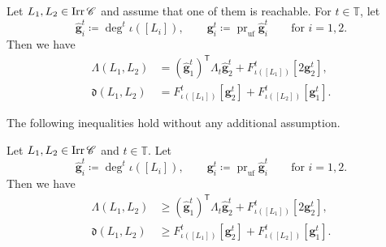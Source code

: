 \begin{Thm}
\label{Thm : tropical F invariants and reachable modules}
Let $L_1, L_2 \in \mathop{\mathrm{Irr}}\nolimits\mathscr{C}$ and assume that one of them
is reachable.
For $t \in \mathbb{T}$, let
\[
\widehat{\mathbf{g}}_i^t \coloneq \deg^t\iota([L_i]),
\qquad
\mathbf{g}_i^t \coloneq
\operatorname{pr}_{\mathrm{uf}}\widehat{\mathbf{g}}_i^t
\qquad\text{for }i = 1, 2.
\]
Then we have
\[
\begin{aligned}
\Lambda(L_1, L_2)
&= (\widehat{\mathbf{g}}_1^t)^{\mathsf{T}}
\Lambda_t\widehat{\mathbf{g}}_2^t
+ F_{\iota([L_1])}^t[2\mathbf{g}_2^t], \\
\mathfrak{d}(L_1, L_2)
&= F_{\iota([L_1])}^t[\mathbf{g}_2^t]
+ F_{\iota([L_2])}^t[\mathbf{g}_1^t].
\end{aligned}
\]
\end{Thm}

The following inequalities hold without any additional assumption.

\begin{Thm}
\label{Thm : tropical F invariants and Lambda inequalities}
Let $L_1, L_2 \in \mathop{\mathrm{Irr}}\nolimits\mathscr{C}$ and $t \in \mathbb{T}$.
Let
\[
\widehat{\mathbf{g}}_i^t \coloneq \deg^t\iota([L_i]),
\qquad
\mathbf{g}_i^t \coloneq
\operatorname{pr}_{\mathrm{uf}}\widehat{\mathbf{g}}_i^t
\qquad\text{for }i = 1, 2.
\]
Then we have
\[
\begin{aligned}
\Lambda(L_1, L_2)
&\geq (\widehat{\mathbf{g}}_1^t)^{\mathsf{T}}
\Lambda_t\widehat{\mathbf{g}}_2^t
+ F_{\iota([L_1])}^t[2\mathbf{g}_2^t], \\
\mathfrak{d}(L_1, L_2)
&\geq F_{\iota([L_1])}^t[\mathbf{g}_2^t]
+ F_{\iota([L_2])}^t[\mathbf{g}_1^t].
\end{aligned}
\]
\end{Thm}

